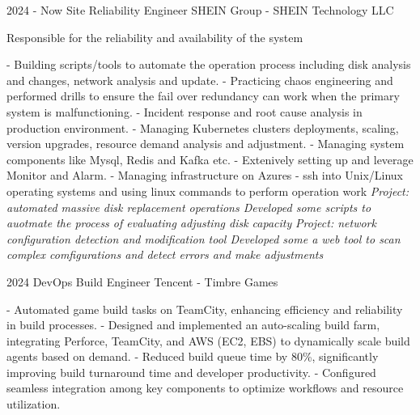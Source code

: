 \documentclass[9pt]{developercv} %
\begin{document}
\begin{entrylist}
	\entry
		{2024 - Now}
		{Site Reliability Engineer}
		{SHEIN Group - SHEIN Technology LLC}
		{
            Responsible for the reliability and availability of the system \newline

            - Building scripts/tools to automate the operation process including disk analysis and changes, network analysis and update. \newline
            - Practicing chaos engineering and performed drills to ensure the fail over redundancy can work when the primary system is malfunctioning. \newline
            - Incident response and root cause analysis in production environment. \newline
            - Managing Kubernetes clusters deployments, scaling, version upgrades, resource demand analysis and adjustment. \newline
			- Managing system components like Mysql, Redis and Kafka etc.\newline
			- Extenively setting up and leverage Monitor and Alarm.\newline
			- Managing infrastructure on Azures\newline
			- ssh into Unix/Linux operating systems and using linux commands to perform operation work\newline\newline
            \textit{Project: automated massive disk replacement operations\newline
            Developed some scripts to auotmate the process of evaluating adjusting disk capacity}\newline\newline
            \textit{Project: network configuration detection and modification tool\newline
            Developed some a web tool to scan complex comfigurations and detect errors and make adjustments}
        }
	\entry
		{2024}
		{DevOps Build Engineer}
		{Tencent - Timbre Games}
		{
            - Automated game build tasks on TeamCity, enhancing efficiency and reliability in build processes. \newline
            - Designed and implemented an auto-scaling build farm, integrating Perforce, TeamCity, and AWS (EC2, EBS) to dynamically scale build agents based on demand.\newline
            - Reduced build queue time by 80\%, significantly improving build turnaround time and developer productivity.\newline
            - Configured seamless integration among key components to optimize workflows and resource utilization.\newline

}
\end{entrylist}
\end{document}
